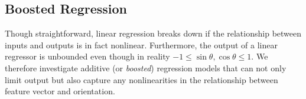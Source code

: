 \documentclass[10pt,twocolumn,letterpaper]{article}
\def\dtcwt{DT-$\mathbb{C}$WT}
\newcommand{\comment}[1]{}
\begin{document}


%


\subsection{Boosted Regression}
\label{s:learning_boosted}
Though straightforward, linear regression breaks down if the relationship between inputs and outputs is in fact nonlinear. Furthermore, the output of a linear regressor is unbounded even though in reality $-1 \leq \sin\theta,\cos\theta \leq 1$. We therefore investigate additive (or \emph{boosted}) regression models that can not only limit output but also capture any nonlinearities in the relationship between feature vector and orientation.
\end{document}
